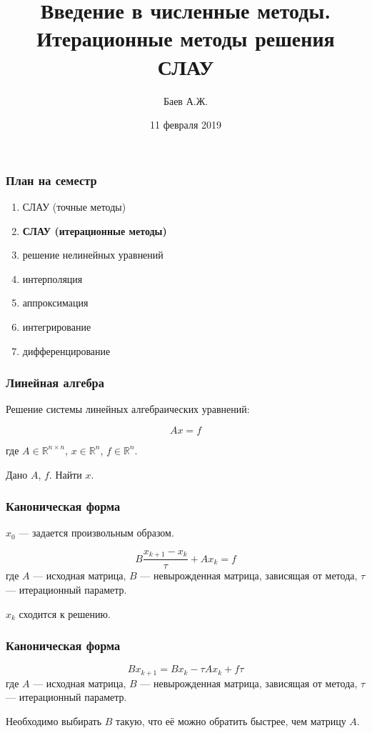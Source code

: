 \documentclass[10pt]{beamer}
\author{Баев А.Ж.}
\title{Введение в численные методы. \\ Итерационные методы решения СЛАУ}
\institute{Казахстанский филиал МГУ}
\date{11 февраля 2019}
\begin{document}
\maketitle


\begin{frame}[fragile]
\frametitle{План на семестр}

\begin{enumerate}
\item СЛАУ (точные методы)
\item \textbf{СЛАУ (итерационные методы)}
\item решение нелинейных уравнений
\item интерполяция 
\item аппроксимация
\item интегрирование
\item дифференцирование
\end{enumerate}

\end{frame}


\begin{frame}[fragile]
\frametitle{Линейная алгебра}

Решение системы линейных алгебраических уравнений:

$$A x = f$$

где $A \in \mathbb{R}^{n \times n}$, $x \in \mathbb{R}^{n}$, $f \in \mathbb{R}^{n}$.

Дано $A$, $f$. Найти $x$.

\end{frame}


\begin{frame}[fragile]
\frametitle{Каноническая форма}

\vfill
$x_0$ --- задается произвольным образом.

\vfill
$$ B \frac{x_{k+1} - x_k}{\tau} + A x_k = f$$
где $A$ --- исходная матрица, $B$ --- невырожденная матрица, зависящая от метода, $\tau$ --- итерационный параметр.

\vfill
$x_k$ сходится к решению.

\vfill

\end{frame}

\begin{frame}[fragile]
\frametitle{Каноническая форма}

$$ B x_{k+1} = B x_k - \tau A x_k + f \tau$$
где $A$ --- исходная матрица, $B$ --- невырожденная матрица, зависящая от метода, $\tau$ --- итерационный параметр.

\vfill

Необходимо выбирать $B$ такую, что её можно обратить быстрее, чем матрицу $A$.

\end{frame}
\end{document}

